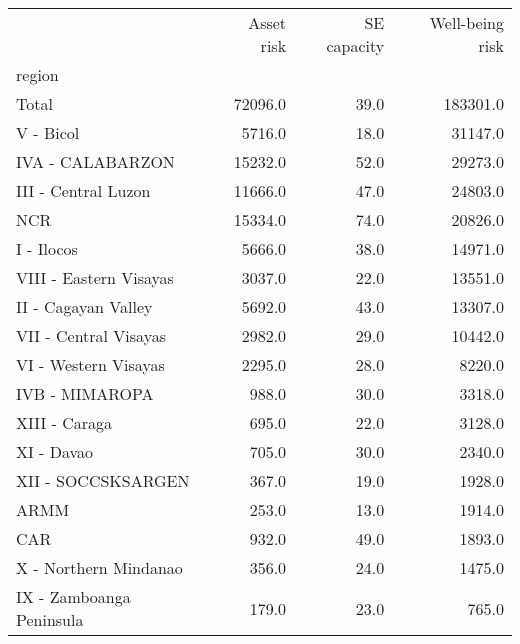 \begin{tabular}{lrrr}
\toprule
{} &  Asset risk &  SE capacity &  Well-being risk \\
region                   &             &              &                  \\
\midrule
Total                    &     72096.0 &         39.0 &         183301.0 \\
V - Bicol                &      5716.0 &         18.0 &          31147.0 \\
IVA - CALABARZON         &     15232.0 &         52.0 &          29273.0 \\
III - Central Luzon      &     11666.0 &         47.0 &          24803.0 \\
NCR                      &     15334.0 &         74.0 &          20826.0 \\
I - Ilocos               &      5666.0 &         38.0 &          14971.0 \\
VIII - Eastern Visayas   &      3037.0 &         22.0 &          13551.0 \\
II - Cagayan Valley      &      5692.0 &         43.0 &          13307.0 \\
VII - Central Visayas    &      2982.0 &         29.0 &          10442.0 \\
VI - Western Visayas     &      2295.0 &         28.0 &           8220.0 \\
IVB - MIMAROPA           &       988.0 &         30.0 &           3318.0 \\
XIII - Caraga            &       695.0 &         22.0 &           3128.0 \\
XI - Davao               &       705.0 &         30.0 &           2340.0 \\
XII - SOCCSKSARGEN       &       367.0 &         19.0 &           1928.0 \\
ARMM                     &       253.0 &         13.0 &           1914.0 \\
CAR                      &       932.0 &         49.0 &           1893.0 \\
X - Northern Mindanao    &       356.0 &         24.0 &           1475.0 \\
IX - Zamboanga Peninsula &       179.0 &         23.0 &            765.0 \\
\bottomrule
\end{tabular}
